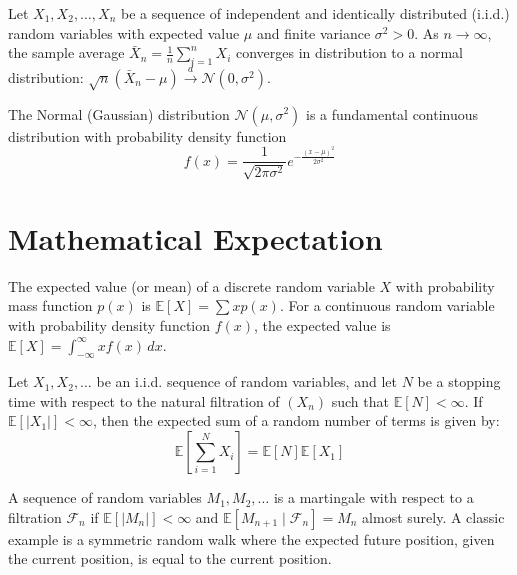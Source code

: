 \begin{theorem}
Let $X_1, X_2, \ldots, X_n$ be a sequence of independent and identically distributed (i.i.d.) random variables with expected value $\mu$ and finite variance $\sigma^2 > 0$. As $n \to \infty$, the sample average $\bar{X}_n = \frac{1}{n} \sum_{i=1}^n X_i$ converges in distribution to a normal distribution: $\sqrt{n}(\bar{X}_n - \mu) \xrightarrow{d} \mathcal{N}(0, \sigma^2)$.
\end{theorem}

\begin{example}
The Normal (Gaussian) distribution $\mathcal{N}(\mu, \sigma^2)$ is a fundamental continuous distribution with probability density function
\[ f(x) = \frac{1}{\sqrt{2\pi\sigma^2}} e^{-\frac{(x-\mu)^2}{2\sigma^2}} \]
\end{example}

\section{Mathematical Expectation}

\begin{definition}
The expected value (or mean) of a discrete random variable $X$ with probability mass function $p(x)$ is $\mathbb{E}[X] = \sum x p(x)$. For a continuous random variable with probability density function $f(x)$, the expected value is $\mathbb{E}[X] = \int_{-\infty}^\infty x f(x) \,dx$.
\end{definition}

\begin{theorem}
Let $X_1, X_2, \ldots$ be an i.i.d. sequence of random variables, and let $N$ be a stopping time with respect to the natural filtration of $(X_n)$ such that $\mathbb{E}[N] < \infty$. If $\mathbb{E}[|X_1|] < \infty$, then the expected sum of a random number of terms is given by:
\[ \mathbb{E}\left[\sum_{i=1}^N X_i\right] = \mathbb{E}[N]\mathbb{E}[X_1] \]
\end{theorem}

\begin{example}[Martingale]
A sequence of random variables $M_1, M_2, \ldots$ is a martingale with respect to a filtration $\mathcal{F}_n$ if $\mathbb{E}[|M_n|] < \infty$ and $\mathbb{E}[M_{n+1} \mid \mathcal{F}_n] = M_n$ almost surely. A classic example is a symmetric random walk where the expected future position, given the current position, is equal to the current position.
\end{example}

